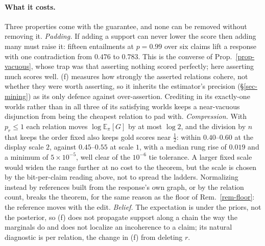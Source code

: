 \paragraph{What it costs.} Three properties come with the guarantee, and none can be removed without
removing it. \emph{Padding.} If adding a support can never lower the score then adding many must raise
it: fifteen entailments at $p=0.99$ over six claims lift a response with one contradiction from
$0.476$ to $0.783$. This is the converse of Prop.~\ref{prop-vacuous}, whose trap was that asserting
nothing scored perfectly; here asserting much scores well. (f) measures how strongly the asserted
relations cohere, not whether they were worth asserting, so it inherits the estimator's precision
(\S\ref{sec-mining}) as its only defence against over-assertion. Crediting \cnc{} in its exactly-one
worlds rather than in all three of its satisfying worlds keeps a near-vacuous disjunction from being
the cheapest relation to pad with. \emph{Compression.} With $p_r\le1$ each relation moves
$\log\mathbb{E}_\pi[G]$ by at most $\log2$, and the division by $n$ that keeps the order fixed also
keeps gold scores near $\tfrac12$: within $0.40$--$0.60$ at the display scale $2$, against
$0.45$--$0.55$ at scale $1$, with a median rung rise of $0.019$ and a minimum of $5\times10^{-5}$,
well clear of the $10^{-6}$ tie tolerance. A larger fixed scale would widen the range further at no
cost to the theorem, but the scale is chosen by the bit-per-claim reading above, not to spread the
ladders. Normalizing instead by references built from the response's own graph, or by the relation
count, breaks the theorem, for the same reason as the floor of Rem.~\ref{rem-floor}: the reference
moves with the edit. \emph{Belief.} The expectation is
under the priors, not the posterior, so (f) does not propagate support along a chain the way the
marginals do and does not localize an incoherence to a claim; its natural diagnostic is per relation,
the change in (f) from deleting $r$.

